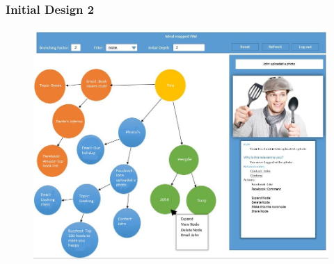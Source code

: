\documentclass{beamer}
\begin{document}
		\begin{frame}
		\frametitle{Initial Design 2}
			\begin{figure}
				\includegraphics[scale=0.35]{initDesign2.jpg}
			\end{figure}
		\end{frame}
\end{document}
